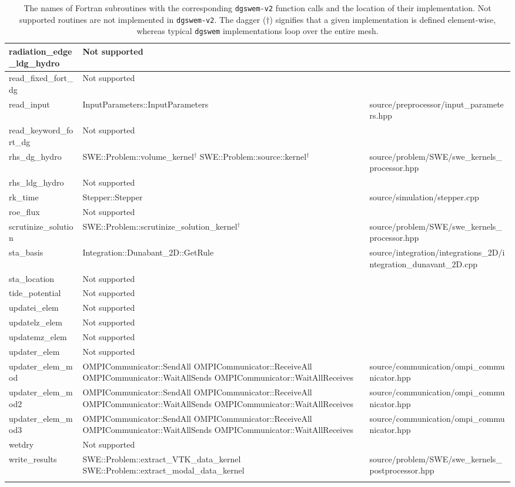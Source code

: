 {\begin{longtable}{ l | p{55mm} | p{86mm} }
\tabularnewline \hline
radiation\_edge\_ldg\_hydro & Not supported &	
\tabularnewline \hline
read\_fixed\_fort\_dg & Not supported &
\tabularnewline \hline
read\_input & InputParameters::InputParameters & source/preprocessor/input\_parameters.hpp
\tabularnewline \hline
read\_keyword\_fort\_dg & Not supported & 
\tabularnewline \hline
rhs\_dg\_hydro & SWE::Problem::volume\_kernel$^\dagger$ \newline SWE::Problem::source::kernel$^\dagger$ & source/problem/SWE/swe\_kernels\_processor.hpp
\tabularnewline \hline
rhs\_ldg\_hydro & Not supported &	
\tabularnewline \hline
rk\_time	& Stepper::Stepper & source/simulation/stepper.cpp
\tabularnewline \hline
roe\_flux & Not supported &
\tabularnewline \hline
scrutinize\_solution & SWE::Problem::scrutinize\_solution\_kernel$^\dagger$ & source/problem/SWE/swe\_kernels\_processor.hpp
\tabularnewline \hline
sta\_basis & Integration::Dunabant\_2D::GetRule & source/integration/integrations\_2D/integration\_dunavant\_2D.cpp
\tabularnewline \hline
sta\_location & Not supported &	
\tabularnewline \hline
tide\_potential	& Not supported &	
\tabularnewline \hline
updatei\_elem & Not supported &
\tabularnewline \hline
updatelz\_elem & Not supported &
\tabularnewline \hline
updatemz\_elem & Not supported &	
\tabularnewline \hline
updater\_elem & Not supported &	
\tabularnewline \hline
updater\_elem\_mod & OMPICommunicator::SendAll \newline OMPICommunicator::ReceiveAll \newline OMPICommunicator::WaitAllSends \newline OMPICommunicator::WaitAllReceives & source/communication/ompi\_communicator.hpp
\tabularnewline \hline
updater\_elem\_mod2 & OMPICommunicator::SendAll \newline OMPICommunicator::ReceiveAll \newline OMPICommunicator::WaitAllSends \newline OMPICommunicator::WaitAllReceives & source/communication/ompi\_communicator.hpp
\tabularnewline \hline
updater\_elem\_mod3 & OMPICommunicator::SendAll \newline OMPICommunicator::ReceiveAll \newline OMPICommunicator::WaitAllSends \newline OMPICommunicator::WaitAllReceives & source/communication/ompi\_communicator.hpp
\tabularnewline \hline
wetdry & Not supported	&
\tabularnewline \hline
write\_results & SWE::Problem::extract\_VTK\_data\_kernel \newline SWE::Problem::extract\_modal\_data\_kernel &	 source/problem/SWE/swe\_kernels\_postprocessor.hpp
\tabularnewline \hline \hline
\caption{The names of Fortran subroutines with the corresponding \texttt{dgswem-v2} function calls and the location of their implementation. Not supported routines are not implemented in \texttt{dgswem-v2}. The dagger ($\dagger$) signifies that a given implementation is defined element-wise, whereas typical \texttt{dgswem} implementations loop over the entire mesh.}
\label{tab:dgswemtodgswemv2}
\end{longtable}
}
